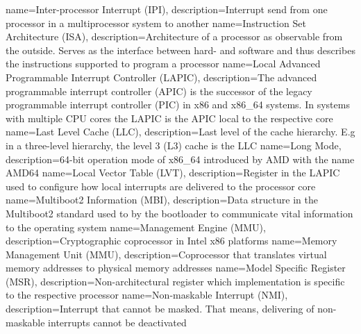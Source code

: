 {
  name=Inter-processor Interrupt (IPI),
  description={Interrupt send from one processor in a multiprocessor system to another}
}
{
  name=Instruction Set Architecture (ISA),
  description={Architecture of a processor as observable from the outside. Serves as the interface between hard- and
  software and thus describes the instructions supported to program a processor}
}
%
{
  name=Local Advanced Programmable Interrupt Controller (LAPIC),
  description={The advanced programmable interrupt controller (APIC) is the successor of the legacy programmable
    interrupt controller (PIC) in x86 and x86\_64 systems. In systems with multiple CPU cores the LAPIC is the
  APIC local to the respective core}
}
{
  name=Last Level Cache (LLC),
  description={Last level of the cache hierarchy. E.g in a three-level hierarchy, the level 3 (L3) cache is the LLC}
}
{
  name=Long Mode,
  description={64-bit operation mode of x86\_64 introduced by AMD with the name AMD64}
}
{
  name=Local Vector Table (LVT),
  description={Register in the LAPIC used to configure how local interrupts are delivered to the processor core}
}
%
{
  name=Multiboot2 Information (MBI),
  description={Data structure in the Multiboot2 standard used to by the bootloader to communicate vital information to
  the operating system}
}
{
  name=Management Engine (MMU),
  description={Cryptographic coprocessor in Intel x86 platforms}
}
{
  name=Memory Management Unit (MMU),
  description={Coprocessor that translates virtual memory addresses to physical memory addresses}
}
{
  name=Model Specific Register (MSR),
  description={Non-architectural register which implementation is specific to the respective processor}
}
%
{
  name=Non-maskable Interrupt (NMI),
  description={Interrupt that cannot be masked. That means, delivering of non-maskable interrupts cannot be
  deactivated}
}
%
